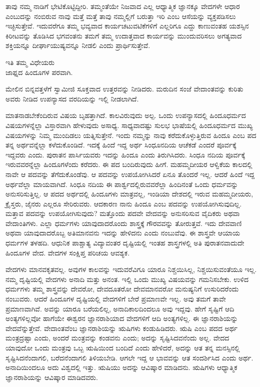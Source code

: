 ತಾವು ನಮ್ಮ ನಾಡಿಗೆ ಭೇಟಿಕೊಟ್ಟಿದ್ದೀರಿ. ತಮ್ಮಂತೆಯೇ ನಿಜವಾದ ಎಲ್ಲ ಆಧ್ಯಾತ್ಮಿಕ ಜ್ಞಾನಕ್ಕೂ ವೇದಗಳೇ ಆಧಾರ ಎಂಬುದನ್ನು ನಂಬಿರುವ ನಾವು ಮತ್ತೆ ಮತ್ತೆ ತಾವು ನಮ್ಮಲ್ಲಿಗೆ ಬರುತ್ತಾ ಇರಿ ಎಂಬ ಆಸೆಯನ್ನು ವ್ಯಕ್ತಪಡಿಸಲು ಇಚ್ಛಿಸುತ್ತೇವೆ. ಇದುವರೆಗೂ ತಮ್ಮ ಭವ್ಯವಾದ ಕಾರ್ಯಚಟುವಟಿಕೆಗಳಿಗೆ ಎಲ್ಲರಿಗೂ ಎದ್ದು ಕಾಣುವಂತಹ ಯಶಸ್ಸಿನ ಕಿರೀಟವನ್ನು ತೊಡಿಸಿದ ಭಗವಂತನು ತಮಗೆ ತಮ್ಮ ಉದಾತ್ತವಾದ ಕಾರ್ಯವನ್ನು ಮುಂದುವರಿಸಲು ಅಗತ್ಯವಾದ ಶಕ್ತಿಯನ್ನೂ ದೀರ್ಘಾಯುಷ್ಯವನ್ನೂ ನೀಡಲಿ ಎಂದು ಪ್ರಾರ್ಥಿಸುತ್ತೇವೆ.

\begin{flushright}
ಇತಿ ತಮ್ಮ ವಿಧೇಯರು\\ಜಾಫ್ನದ ಹಿಂದೂಗಳ ಪರವಾಗಿ.
\end{flushright}

ಮೇಲಿನ ಬಿನ್ನವತ್ತಳೆಗೆ ಸ್ವಾಮೀಜಿ ಸೂಕ್ತವಾದ ಉತ್ತರವನ್ನು ನೀಡಿದರು. ಮರುದಿನ ಸಂಜೆ ವೇದಾಂತವನ್ನು ಕುರಿತು ಅವರು ನೀಡಿದ ಉಪನ್ಯಾಸದ ವರದಿಯನ್ನು ಇಲ್ಲಿ ನೀಡಲಾಗಿದೆ.

ಮಾತನಾಡಬೇಕೆಂದಿರುವ ವಿಷಯ ಬೃಹತ್ತಾಗಿದೆ. ಕಾಲವಿರುವುದು ಅಲ್ಪ. ಒಂದು ಉಪನ್ಯಾಸದಲ್ಲಿ ಹಿಂದೂಧರ್ಮದ ವಿಷಯಗಳನ್ನೆಲ್ಲಾ ವಿಸ್ತಾರವಾಗಿ ಹೇಳುವುದು ಅಸಾಧ್ಯ. ಸಾಧ್ಯವಾದಷ್ಟು ಸುಲಭ ಭಾಷೆಯಲ್ಲಿ ಹಿಂದೂಧರ್ಮದ ಮುಖ್ಯ ವಿಷಯಗಳನ್ನು ನಿಮ್ಮ ಮುಂದಿಡಲು ಯತ್ನಿಸುತ್ತೇನೆ. ಇಂದು ನಮ್ಮನ್ನು ನಾವು ಕರೆದುಕೊಳ್ಳುತ್ತಿರುವ ಹಿಂದೂ ಎಂಬ ಪದ ತನ್ನ ಅರ್ಥವನ್ನೆಲ್ಲಾ ಕಳೆದುಕೊಂಡಿದೆ. ಇದಕ್ಕೆ ಹಿಂದೆ ಇದ್ದ ಅರ್ಥ ಸಿಂಧೂನದಿಯ ಆಚೆಕಡೆ ಎಂದರೆ ಪೂರ್ವಕ್ಕೆ ಇದ್ದವರು ಎಂದು. ಪುರಾತನ ಪಾರ್ಸಿಯವರು ಇದನ್ನು ಹಿಂದೂ ಎಂದು ತಿರುಗಿಸಿದರು. ಸಿಂಧೂ ನದಿಯ ಪೂರ್ವಕ್ಕೆ ಇರುವವರನ್ನೆಲ್ಲಾ ಹಿಂದೂಗಳೆಂದು ಕರೆದರು. ಈ ಪದ ಬಂದಿರುವುದು ಹೀಗೆ. ಮಹಮ್ಮದೀಯರ ಆಳ್ವಿಕೆಯ ಕಾಲದಲ್ಲಿ ನಾವೇ ಆ ಪದವನ್ನು ತೆಗೆದುಕೊಂಡೆವು. ಆ ಪದವನ್ನು ಉಪಯೋಗಿಸಿದರೆ ಏನೂ ತೊಂದರೆ ಇಲ್ಲ. ಆದರೆ ಹಿಂದೆ ಇದ್ದ ಅರ್ಥವೆಲ್ಲಾ ಮಾಯವಾಗಿದೆ. ಸಿಂಧೂ ನದಿಯ ಈ ಪಾರ್ಶ್ವದಲ್ಲಿರುವವರೆಲ್ಲಾ ಹಿಂದಿನಂತೆ ಒಂದು ಧರ್ಮವನ್ನು ಅನುಸರಿಸುತ್ತಿಲ್ಲ. ಆ ಪದದ ಅರ್ಥದಲ್ಲಿ ಹಿಂದೂಗಳು ಮಾತ್ರವಲ್ಲ, ಇಂಡಿಯಾ ದೇಶದಲ್ಲಿ ಇರುವ ಮಹಮ್ಮದೀಯರು, ಕ್ರೈಸ್ತರು, ಜೈನರು ಎಲ್ಲರೂ ಸೇರಿರುವರು. ಆದಕಾರಣ ನಾನು ಹಿಂದೂ ಎಂಬ ಪದವನ್ನು ಉಪಯೋಗಿಸುವುದಿಲ್ಲ. ಮತ್ತಾವ ಪದವನ್ನು ಉಪಯೋಗಿಸುವುದು? ಮತ್ತೊಂದು ಪದವೇ ವೇದವನ್ನು ಅನುಸರಿಸುವ ವೈದಿಕರು ಅಥವಾ ವೇದಾಂತಿಗಳು. ಎಲ್ಲಾ ಧರ್ಮಗಳು ಯಾವುದಾದರೊಂದು ಶಾಸ್ತ್ರಕ್ಕೆ ಗೌರವವನ್ನು ತೋರುತ್ತವೆ. ಇದು ದೇವವಾಣಿ ಅಥವಾ ಯಾವುದಾದರೊಬ್ಬ ಅತಿಮಾನವನು ಇದನ್ನು ಹೇಳಿದನು ಎಂದು ನಂಬುವೆವು. ಈ ಶಾಸ್ತ್ರವೇ ಆಯಾಯ ಧರ್ಮಗಳ ತಳಹದಿ. ಆಧುನಿಕ ಪಾಶ್ಚಾತ್ಯ ವಿದ್ಯಾವಂತರ ದೃಷ್ಟಿಯಲ್ಲಿ ಇಂತಹ ಶಾಸ್ತ್ರಗಳಲ್ಲಿ ಅತಿ ಪುರಾತನವಾದುದೇ ಹಿಂದೂಗಳ ವೇದ. ವೇದಗಳ ಸಂಕ್ಷಿಪ್ತ ಪರಿಚಯ ಆವಶ್ಯಕ.

ವೇದಗಳು ಮಾನವಕೃತವಲ್ಲ. ಅವುಗಳ ಕಾಲವನ್ನು ಇದುವರೆವಿಗೂ ಯಾರೂ ನಿಶ್ಚಯಿಸಿಲ್ಲ, ನಿಶ್ಚಯಿಸುವಂತೆಯೂ ಇಲ್ಲ. ನಮ್ಮ ದೃಷ್ಟಿಯಲ್ಲಿ ವೇದಗಳು ಅನಾದಿ ಮತ್ತು ಅನಂತ. ಇಲ್ಲಿ ಒಂದು ಮುಖ್ಯ ವಿಷಯವನ್ನು ಗಮನಿಸಬೇಕು. ಉಳಿದ ಧರ್ಮಗಳು ತಮ್ಮ ಶಾಸ್ತ್ರವನ್ನು ದೇವರೋ, ದೇವದೂತರೋ ದೇವಮಾನವರೋ ಮನುಷ್ಯನಿಗೆ ಉಸುರಿದರೆಂದು ನಂಬುವರು. ಆದರೆ ಹಿಂದೂಗಳ ದೃಷ್ಟಿಯಲ್ಲಿ ವೇದಗಳಿಗೆ ಬೇರೆ ಪ್ರಮಾಣವೇ ಇಲ್ಲ. ಅವು ತಮಗೆ ತಾವೇ ಪ್ರಮಾಣವಾಗಿವೆ. ಅವನ್ನು ಯಾರೂ ಬರೆಯಲಿಲ್ಲ, ಅನಾದಿಕಾಲದಿಂದಲೂ ಅವು ಇದ್ದವು. ಹೇಗೆ ಸೃಷ್ಟಿಗೆ ಆದಿ ಅಂತ್ಯಗಳಿಲ್ಲವೋ ಹಾಗೆಯೇ ಈಶ್ವರನ ಜ್ಞಾನರಾಶಿಯಾದ ವೇದಗಳಿಗೆ ಆದಿ ಅಂತ್ಯಗಳಿಲ್ಲ. ಈ ಜ್ಞಾನರಾಶಿಯನ್ನು ವೇದವೆನ್ನುತ್ತೇವೆ. ವೇದಾಂತವೆಂಬ ಜ್ಞಾನರಾಶಿಯನ್ನು ಋಷಿಗಳು ಕಂಡುಹಿಡಿದರು. ಋಷಿ ಎಂಬ ಪದದ ಅರ್ಥ ಮಂತ್ರದ್ರಷ್ಟಾ ಎಂದು, ಅಂದರೆ ಮಂತ್ರವನ್ನು ಕಂಡವನು ಎಂದು; ಅದನ್ನು ಸೃಷ್ಟಿಸಿದವನೆಂದು ಅಲ್ಲ. ವೇದದ ಯಾವುದೋ ಒಂದು ಮಂತ್ರವು ಒಬ್ಬ ಋಷಿಯಿಂದ ಬಂದಿದೆ ಎಂದು ಹೇಳಿದರೆ, ಅದನ್ನು ಆತ ತನ್ನ ಮನಸ್ಸಿನಲ್ಲಿ ಸೃಷ್ಟಿಸಿದನೆಂದಾಗಲಿ, ಬರೆದನೆಂದಾಗಲಿ ತಿಳಿಯಬೇಡಿ. ಆಗಲೇ ಇದ್ದ ಆ ಭಾವವನ್ನು ಆತ ಸಂದರ್ಶಿಸಿದ ಎಂದು ಅರ್ಥ. ಅನಾದಿಯಿಂದಲೂ ಅದು ವಿಶ್ವದಲ್ಲಿ ಇತ್ತು. ಋಷಿಯು ಅದನ್ನು ಆವಿಷ್ಕಾರ ಮಾಡಿದನು. ಋಷಿಗಳು ಆಧ್ಯಾತ್ಮಿಕ ಜ್ಞಾನರಾಶಿಯನ್ನು ಆವಿಷ್ಕಾರ ಮಾಡಿದವರು.

